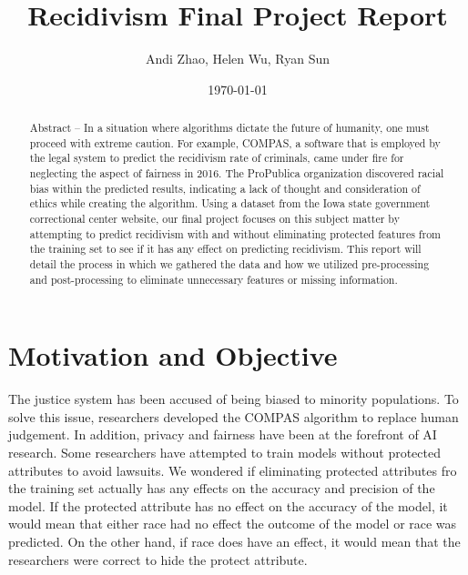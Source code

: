 \documentclass[10.5pt, twocolumn]{acmart}
\begin{document}
\title{Recidivism Final Project Report}
\author{Andi Zhao, Helen Wu, Ryan Sun}
\date{\today}

\setlength\textwidth{\dimexpr (3in -1in/16)*2 + 3in/8\relax}
\setlength\columnsep{\dimexpr 3in/8\relax}

\begin{abstract}
Abstract – In a situation where algorithms dictate the future of humanity, one must proceed with extreme caution. For example, COMPAS, a software that is employed by the legal system to predict the recidivism rate of criminals, came under fire for neglecting the aspect of fairness in 2016. The ProPublica organization discovered racial bias within the predicted results, indicating a lack of thought and consideration of ethics while creating the algorithm. Using a dataset from the Iowa state government correctional center website, our final project focuses on this subject matter by attempting to predict recidivism with and without eliminating protected features from the training set to see if it has any effect on predicting recidivism. This report will detail the process in which we gathered the data and how we utilized pre-processing and post-processing to eliminate unnecessary features or missing information. 
\end{abstract}

\renewcommand\footnotetextcopyrightpermission[1]{}
\pagestyle{plain}

\maketitle


\section{Motivation and Objective}
The justice system has been accused of being biased to minority populations. To solve this issue, researchers developed the COMPAS algorithm to replace human judgement. In addition, privacy and fairness have been at the forefront of AI research. Some researchers have attempted to train models without protected attributes to avoid lawsuits. We wondered if eliminating protected attributes fro the training set actually has any effects on the accuracy and precision of the model. If the protected attribute has no effect on the accuracy of the model, it would mean that  either race had no effect the outcome of the model or race was predicted. On the other hand, if race does have an effect, it would mean that the researchers were correct to hide the protect attribute.
\end{document}
